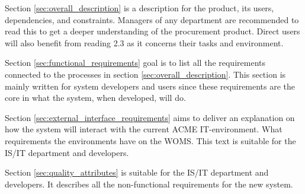 Section \ref{sec:overall_description} is a description for the product, its users, dependencies, and constraints. Managers of any department are recommended to read this to get a deeper understanding of the procurement product. Direct users will also benefit from reading 2.3 as it concerns their tasks and environment.

Section \ref{sec:functional_requirements} goal is to list all the requirements connected to the processes in section \ref{sec:overall_description}. This section is mainly written for system developers and users since these requirements are the core in what the system, when developed, will do. 

Section \ref{sec:external_interface_requirements} aims to deliver an explanation on how the system will interact with the current ACME IT-environment. What requirements the environments have on the WOMS. This text is suitable for the IS/IT department and developers.

Section \ref{sec:quality_attributes} is suitable for the IS/IT department and developers. It describes all the non-functional requirements for the new system. 

